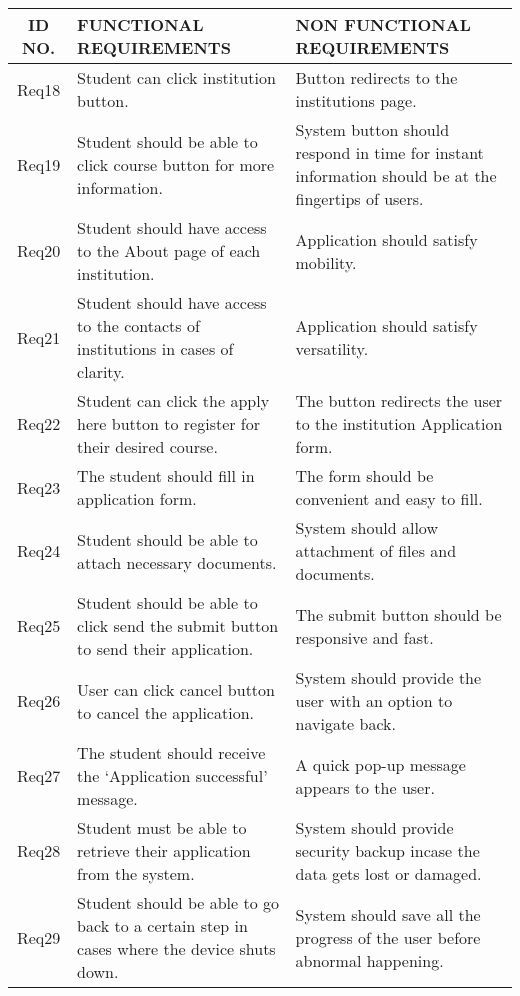 \begin{table}[ht]
\begin{tabular}{|c|p{7cm}|p{7cm}|}
	\end{tabular}
\end{table}

\begin{table}[ht]
	\centering
	\begin{tabular}{|c|p{7cm}|p{7cm}|}
		\hline
		ID NO. & FUNCTIONAL REQUIREMENTS & NON FUNCTIONAL REQUIREMENTS\\
		\hline
		Req18 & Student can click institution button.& Button redirects to the institutions page.\\
		\hline
		Req19&Student should be able to click course button for more information. &System button should respond in time for instant information should be at the fingertips of users.\\
		\hline
		Req20 & Student should have access to the About page of each institution. & Application should satisfy mobility.\\
		\hline
		Req21 & Student should have access to the contacts of institutions in cases of clarity.& Application should satisfy versatility.\\
		\hline
		Req22 & Student can click the apply here button to register for their desired course.& The button redirects the user to the institution Application form.\\
		\hline
		Req23 &The student should fill in application form. & The form should be convenient and easy to fill.\\
		\hline
		Req24 & Student should be able to attach necessary documents. & System should allow attachment of files and documents.\\
		\hline
		Req25 & Student should be able to click send the submit button to send their application.& The submit button should be responsive and fast.\\
		\hline
		Req26 &User can click cancel button to cancel the application. & System should provide the user with an option to navigate back.\\
		\hline
		Req27 & The student should receive the 
		‘Application successful’ message.
		& A quick pop-up message appears to the user.\\
		\hline
		Req28 & Student must be able to retrieve their application from the system. & System should provide security backup incase the data gets lost or damaged.\\
		\hline
		Req29 & Student should be able to go back to a certain step in cases where the device shuts down. & System should save all the progress of the user before abnormal happening.\\ 

\end{tabular}
\end{table}
